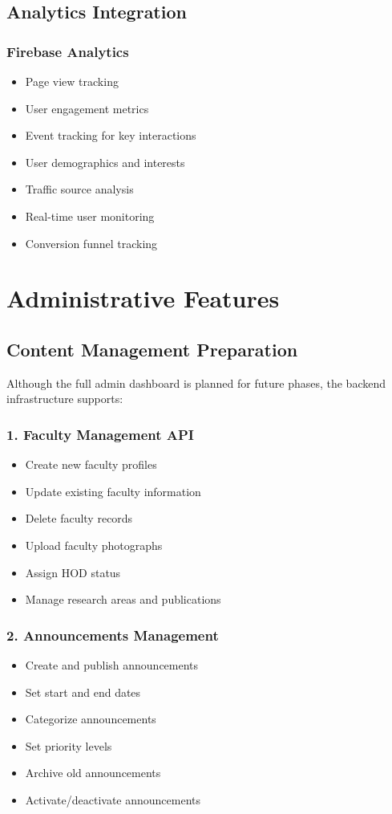 \documentclass[12pt,a4paper]{report}
\begin{document}
\subsection{Analytics Integration}

\subsubsection*{Firebase Analytics}
\begin{itemize}
    \item Page view tracking
    \item User engagement metrics
    \item Event tracking for key interactions
    \item User demographics and interests
    \item Traffic source analysis
    \item Real-time user monitoring
    \item Conversion funnel tracking
\end{itemize}

\section{Administrative Features}

\subsection{Content Management Preparation}

Although the full admin dashboard is planned for future phases, the backend infrastructure supports:

\subsubsection*{1. Faculty Management API}
\begin{itemize}
    \item Create new faculty profiles
    \item Update existing faculty information
    \item Delete faculty records
    \item Upload faculty photographs
    \item Assign HOD status
    \item Manage research areas and publications
\end{itemize}

\subsubsection*{2. Announcements Management}
\begin{itemize}
    \item Create and publish announcements
    \item Set start and end dates
    \item Categorize announcements
    \item Set priority levels
    \item Archive old announcements
    \item Activate/deactivate announcements
\end{itemize}
\end{document}
